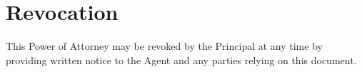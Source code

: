 
\section{Revocation}
\label{sec:revocation}

This Power of Attorney may be revoked by the Principal at any time by providing written notice to the Agent and any parties relying on this document.


